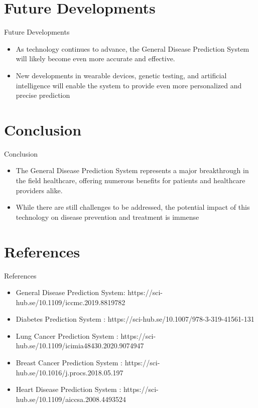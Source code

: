 \documentclass{SKP-beamer}
\begin{document}
\section{\textbf{Future Developments}}

\begin{frame}{Future Developments}
	\begin{itemize}
	\item As technology continues to advance, the General Disease Prediction System will likely become even more accurate and effective.
	\item New developments in wearable devices, genetic testing, and artificial intelligence will enable the system to provide even more personalized and precise prediction
    \end{itemize}
\end{frame}

\section{\textbf{Conclusion}}

\begin{frame}{Conclusion}
	\begin{itemize}
	\item The General Disease Prediction System represents a major breakthrough in the field healthcare, offering numerous benefits for patients and healthcare providers alike.
	\item While there are still challenges to be addressed, the potential impact of this technology on disease prevention and treatment is immense
    \end{itemize}
\end{frame}

\section{\textbf{References}}

\begin{frame}{References}
	\begin{itemize}
	\item General Disease Prediction System: https://sci-hub.se/10.1109/iccmc.2019.8819782
	\item Diabetes Prediction System : https://sci-hub.se/10.1007/978-3-319-41561-131
	\item Lung Cancer Prediction System : https://sci-hub.se/10.1109/icimia48430.2020.9074947
	\item Breast Cancer Prediction System : https://sci-hub.se/10.1016/j.procs.2018.05.197
	\item Heart Disease Prediction System : https://sci-hub.se/10.1109/aiccsa.2008.4493524
    \end{itemize}	 
\end{frame}
\end{document}
